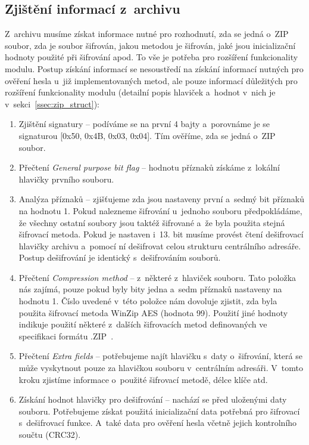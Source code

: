 \subsection{Zjištění informací z~archivu}
Z~archivu musíme získat informace nutné pro rozhodnutí, zda se jedná o~ZIP soubor, zda je soubor
šifrován, jakou metodou je šifrován, jaké jsou inicializační hodnoty použité při šifrování apod.
To vše je potřeba pro rozšíření funkcionality modulu. Postup získání informací se nesoustředí na
získání informací nutných pro ověření hesla u~již implementovaných metod, ale pouze informací
důležitých pro rozšíření funkcionality modulu (detailní popis hlaviček a~hodnot v~nich je
v~sekci~\ref{ssec:zip_struct}):
\begin{enumerate}
    \item Zjištění signatury -- podíváme se na první 4 bajty a~porovnáme je se signaturou [0x50,
	0x4B, 0x03, 0x04]. Tím ověříme, zda se jedná o~ZIP soubor.
    \item Přečtení {\it General purpose bit flag} -- hodnotu příznaků získáme z~lokální hlavičky
	prvního souboru.
    \item Analýza příznaků -- zjišťujeme zda jsou nastaveny první a~sedmý bit příznaků na hodnotu
	1. Pokud nalezneme šifrování u~jednoho souboru předpokládáme, že všechny ostatní soubory
	jsou taktéž šifrované a~že byla použita stejná šifrovací metoda. Pokud je nastaven i~13.
	bit musíme provést čtení dešifrovací hlavičky archivu a~pomocí ní dešifrovat celou
	strukturu centrálního adresáře. Postup dešifrování je identický s~dešifrováním souborů.
    \item Přečtení {\it Compression method} -- z~některé z~hlaviček %
	souboru. Tato položka nás zajímá, pouze pokud byly bity jedna a~sedm příznaků nastaveny na
	hodnotu 1. Číslo uvedené v~této položce nám dovoluje zjistit, zda byla použita šifrovací
	metoda WinZip AES (hodnota 99). Použití jiné hodnoty indikuje použití některé z~dalších
	šifrovacích metod definovaných ve specifikaci formátu .ZIP~\cite{PKWARE:2014}.
    \item Přečtení {\it Extra fields} -- potřebujeme najít hlavičku s~daty o~šifrování, která se
	může vyskytnout pouze za hlavičkou souboru v~centrálním adresáři. V~tomto kroku zjistíme
	informace o~použité šifrovací metodě, délce klíče atd.
    \item Získání hodnot hlavičky pro dešifrování -- nachází se před uloženými daty souboru.
	Potřebujeme získat použitá inicializační data potřebná pro šifrovací s~dešifrovací funkce.
	A~také data pro ověření hesla včetně jejich kontrolního součtu (CRC32).
\end{enumerate}

